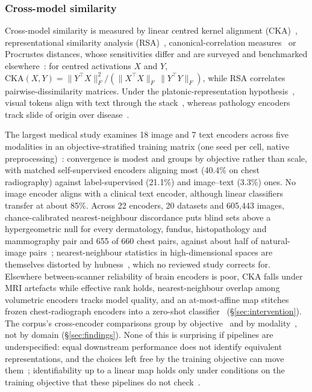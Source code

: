 \subsubsection{Cross-model similarity}

Cross-model similarity is measured by linear centred kernel alignment
(CKA)~\cite{kornblith2019similarity}, representational similarity analysis
(RSA)~\cite{kriegeskorte2008representational}, canonical-correlation
measures~\cite{raghu2017svcca,morcos2018insights} or Procrustes distances, whose sensitivities differ and are
surveyed and benchmarked elsewhere~\cite{klabunde2023similarity,ding2021grounding}: for centred activations $X$
and $Y$, $\mathrm{CKA}(X,Y)=\|Y^{\top}X\|_F^{2}/(\|X^{\top}X\|_F\,\|Y^{\top}Y\|_F)$, while RSA correlates pairwise-dissimilarity matrices. Under the
platonic-representation hypothesis~\cite{huh2024platonic}, visual tokens align with text through the
stack~\cite{neo2024towards}, whereas pathology encoders track slide of origin over
disease~\cite{mishra2025comparing}.

The largest medical study examines 18 image and 7 text encoders across five modalities in an
objective-stratified training matrix (one seed per cell, native preprocessing)~\cite{tayebiarasteh2026self}:
convergence is modest and groups by objective rather than scale, with matched self-supervised encoders
aligning most (40.4\% on chest radiography) against label-supervised (21.1\%) and image--text (3.3\%) ones.
No image encoder aligns with a clinical text encoder, although linear classifiers transfer at about 85\%. Across 22 encoders, 20 datasets
and 605,443 images, chance-calibrated nearest-neighbour discordance puts blind sets above a
hypergeometric null for every dermatology, fundus, histopathology and mammography pair and 655 of
660 chest pairs, against about half of natural-image pairs~\cite{arasteh2026candor}; nearest-neighbour
statistics in high-dimensional spaces are themselves distorted by hubness~\cite{radovanovic2010hubs}, which
no reviewed study corrects for. Elsewhere between-scanner reliability of brain encoders is poor, CKA falls under MRI artefacts while
effective rank holds, nearest-neighbour overlap among volumetric encoders tracks model quality, and an
at-most-affine map stitches frozen chest-radiograph encoders into a zero-shot
classifier~\cite{navarrogonzalez2026crossscanner,mielcarz2026do,aerts2025foundation,folco2025semantic}
(\S\ref{sec:intervention}). The corpus's cross-encoder
comparisons group by objective~\cite{tayebiarasteh2026self} and by modality~\cite{arasteh2026candor}, not by
domain (\S\ref{sec:findings}). None of this is surprising if pipelines are underspecified: equal downstream
performance does not identify equivalent representations, and the choices left free by the training
objective can move them~\cite{damour2022underspecification}; identifiability up to a linear map holds only under
conditions on the training objective that these pipelines do not check~\cite{roeder2020linear}.

